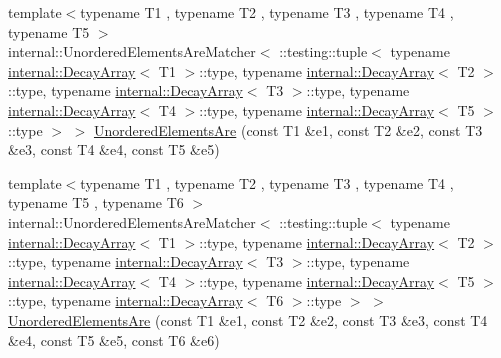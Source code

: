 \begin{DoxyCompactItemize}
\item 
{\footnotesize template$<$typename T1 , typename T2 , typename T3 , typename T4 , typename T5 $>$ }\\internal\+::\+Unordered\+Elements\+Are\+Matcher$<$ \+::testing\+::tuple$<$ typename \mbox{\hyperlink{structtesting_1_1internal_1_1_decay_array}{internal\+::\+Decay\+Array}}$<$ T1 $>$\+::type, typename \mbox{\hyperlink{structtesting_1_1internal_1_1_decay_array}{internal\+::\+Decay\+Array}}$<$ T2 $>$\+::type, typename \mbox{\hyperlink{structtesting_1_1internal_1_1_decay_array}{internal\+::\+Decay\+Array}}$<$ T3 $>$\+::type, typename \mbox{\hyperlink{structtesting_1_1internal_1_1_decay_array}{internal\+::\+Decay\+Array}}$<$ T4 $>$\+::type, typename \mbox{\hyperlink{structtesting_1_1internal_1_1_decay_array}{internal\+::\+Decay\+Array}}$<$ T5 $>$\+::type $>$ $>$ \mbox{\hyperlink{namespacetesting_a5e0ff76eb3f61b6c79b60311ceca73d3}{Unordered\+Elements\+Are}} (const T1 \&e1, const T2 \&e2, const T3 \&e3, const T4 \&e4, const T5 \&e5)
\item 
{\footnotesize template$<$typename T1 , typename T2 , typename T3 , typename T4 , typename T5 , typename T6 $>$ }\\internal\+::\+Unordered\+Elements\+Are\+Matcher$<$ \+::testing\+::tuple$<$ typename \mbox{\hyperlink{structtesting_1_1internal_1_1_decay_array}{internal\+::\+Decay\+Array}}$<$ T1 $>$\+::type, typename \mbox{\hyperlink{structtesting_1_1internal_1_1_decay_array}{internal\+::\+Decay\+Array}}$<$ T2 $>$\+::type, typename \mbox{\hyperlink{structtesting_1_1internal_1_1_decay_array}{internal\+::\+Decay\+Array}}$<$ T3 $>$\+::type, typename \mbox{\hyperlink{structtesting_1_1internal_1_1_decay_array}{internal\+::\+Decay\+Array}}$<$ T4 $>$\+::type, typename \mbox{\hyperlink{structtesting_1_1internal_1_1_decay_array}{internal\+::\+Decay\+Array}}$<$ T5 $>$\+::type, typename \mbox{\hyperlink{structtesting_1_1internal_1_1_decay_array}{internal\+::\+Decay\+Array}}$<$ T6 $>$\+::type $>$ $>$ \mbox{\hyperlink{namespacetesting_aff1859501ecd94dd1bc428d146a66fdc}{Unordered\+Elements\+Are}} (const T1 \&e1, const T2 \&e2, const T3 \&e3, const T4 \&e4, const T5 \&e5, const T6 \&e6)
\item 

\end{DoxyCompactItemize}
